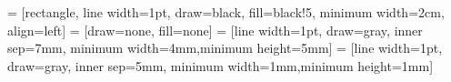\lstset{numbers=none, style=DumpStyle}


 = [rectangle, line width=1pt, draw=black, fill=black!5, minimum width=2cm, align=left]
 = [draw=none, fill=none]
 = [line width=1pt, draw=gray, inner sep=7mm, minimum width=4mm,minimum height=5mm]
 = [line width=1pt, draw=gray, inner sep=5mm, minimum width=1mm,minimum height=1mm]

\setlength{\columnsep}{1cm}

\newcommand{\keyword}[1]{\textcolor{red}{\emph{#1}}}
\newcommand{\myblocknode}[2]{\node[squarednode,label={[shift={(0.0,0)}]\scriptsize[#1] \hspace{0.5cm} #2}] }
\newcommand{\myloopframe}[2]{\node[label={[shift={(0,0)}]LOOP \hspace{1.3cm} \scriptsize0001}, frame_loop,fit= (#1) (#2)]{}}
\newcommand{\mylooplabel}[1]{LOOP \hspace{1.3cm} \scriptsize#1}
\newcommand{\mymargin}[1]{}


